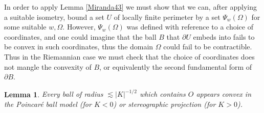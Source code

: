 \documentclass[reqno,10pt]{amsart}
\newtheorem{lemma}[theorem]{Lemma}
\theoremstyle{definition}
\numberwithin{equation}{section}
\begin{document}
In order to apply Lemma \ref{Miranda43} we must show that we can, after applying a suitable isometry, bound a set $U$ of locally finite perimeter by a set $\Psi_w(\Omega)$ for some suitable $w, \Omega$.
However, $\Psi_w(\Omega)$ was defined with reference to a choice of coordinates, and one could imagine that the ball $B$ that $\partial U$ embeds into fails to be convex in such coordinates, thus the domain $\Omega$ could fail to be contractible.
Thus in the Riemannian case we must check that the choice of coordinates does not mangle the convexity of $B$, or equivalently the second fundamental form of $\partial B$.

\begin{lemma}\label{convex balls}
Every ball of radius $\lesssim |K|^{-1/2}$ which contains $O$ appears convex in the Poincar\'e ball model (for $K < 0$) or stereographic projection (for $K > 0$).
\end{lemma}
\end{document}
